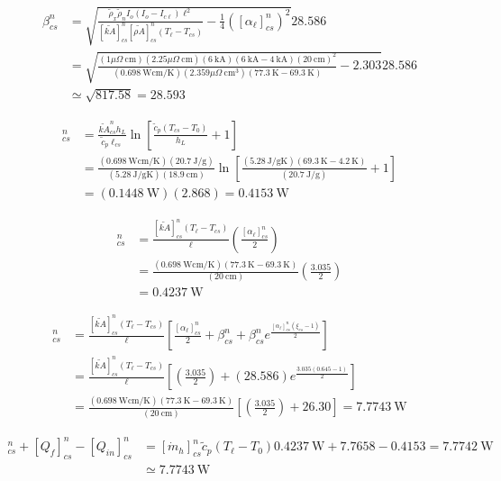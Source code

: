 \begin{align}%
\beta_{cs}^{n}&=\sqrt{\frac{\tilde{\rho}_x\tilde{\rho}_nI_o(I_o-I_{c\ell})\ell^2}{[\tilde{kA}]_{cs}^{n}[\tilde{\rho A}]_{cs}^{n}(T_\ell-T_{cs})}-\frac{1}{4}([\alpha_\ell]_{cs}^{n})^2}
28.586\\
&=\sqrt{\frac{(1\mu\Omega\ \mathrm{cm})(2.25\mu\Omega\ \mathrm{cm})(6\ \mathrm{kA})(6\ \mathrm{kA}-4\ \mathrm{kA})(20\ \mathrm{cm})^2}{(0.698\ \mathrm{W cm/K})(2.359\mu\Omega\ \mathrm{cm^3})(77.3\ \mathrm{K}-69.3\ \mathrm{K})}-2.303}
28.586\\
&\simeq\sqrt{817.58}=28.593
\end{align}

\begin{align}%
[Q_{in}]_{cs}^{n}&=\frac{\tilde{kA}_{cs}^{n}h_L}{\tilde{c}_p\ell_{cs}}\ln\left[\frac{\tilde{c}_p(T_{cs}-T_0)}{h_L}+1\right] \\
&=\frac{(0.698\ \mathrm{W cm/K})(20.7\ \mathrm{J/g})}{(5.28\ \mathrm{J/gK})(18.9\ \mathrm{cm})}\ln\left[\frac{(5.28\ \mathrm{J/gK})(69.3\ \mathrm{K}-4.2\ \mathrm{K})}{(20.7\ \mathrm{J/g})}+1\right] \\
&=(0.1448\ \mathrm{W})(2.868)=0.4153\ \mathrm{W}
\end{align}

\begin{align}%
[Q_\ell]_{cs}^{n}&=\frac{[\tilde{kA}]_{cs}^{n}(T_\ell-T_{cs})}{\ell}\left(\frac{[\alpha_\ell]_{cs}^{n}}{2}\right) \\
&=\frac{(0.698\ \mathrm{W cm/K})(77.3\ \mathrm{K}-69.3\ \mathrm{K})}{(20\ \mathrm{cm})}\left(\frac{3.035}{2}\right)\\
&=0.4237\ \mathrm{W}
\end{align}

\begin{align}%
[Q_j]_{cs}^{n}&=\frac{[\tilde{kA}]_{cs}^{n}(T_\ell-T_{cs})}{\ell}\left[\frac{[\alpha_\ell]_{cs}^{n}}{2}+\beta_{cs}^{n}+\beta_{cs}^{n}e^{\frac{[\alpha_\ell]_{cs}^{n}(\xi_{cs}-1)}{2}}\right] \\
&=\frac{[\tilde{kA}]_{cs}^{n}(T_\ell-T_{cs})}{\ell}\left[\left(\frac{3.035}{2}\right)+(28.586)e^{\frac{3.035(0.645-1)}{2}}\right] \\
&=\frac{(0.698\ \mathrm{W cm/K})(77.3\ \mathrm{K}-69.3\ \mathrm{K})}{(20\ \mathrm{cm})}\left[\left(\frac{3.035}{2}\right)+26.30\right]=7.7743\ \mathrm{W}
\end{align}

\begin{align}%
[Q_\ell]_{cs}^{n}+[Q_f]_{cs}^{n}-[Q_{in}]_{cs}^{n}&=[\dot{m}_h]_{cs}^{n}\tilde{c}_p(T_\ell-T_0)
0.4237\ \mathrm{W}+7.7658-0.4153=7.7742\ \mathrm{W} \\
&\simeq 7.7743\ \mathrm{W}             
\end{align}

